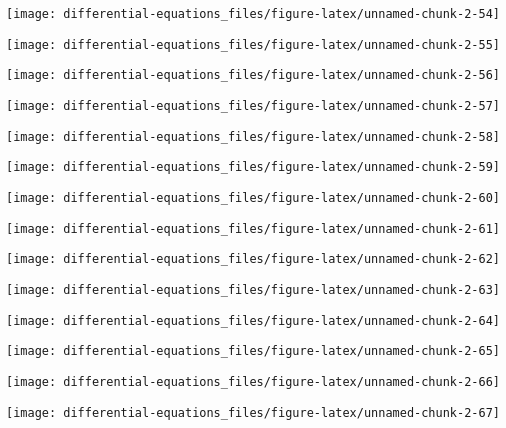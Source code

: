 \documentclass[]{tufte-handout}
\begin{document}
\begin{marginfigure}
\texttt{[image: differential-equations\_files/figure-latex/unnamed-chunk-2-54]} \end{marginfigure}
\begin{marginfigure}
\texttt{[image: differential-equations\_files/figure-latex/unnamed-chunk-2-55]} \end{marginfigure}
\begin{marginfigure}
\texttt{[image: differential-equations\_files/figure-latex/unnamed-chunk-2-56]} \end{marginfigure}
\begin{marginfigure}
\texttt{[image: differential-equations\_files/figure-latex/unnamed-chunk-2-57]} \end{marginfigure}
\begin{marginfigure}
\texttt{[image: differential-equations\_files/figure-latex/unnamed-chunk-2-58]} \end{marginfigure}
\begin{marginfigure}
\texttt{[image: differential-equations\_files/figure-latex/unnamed-chunk-2-59]} \end{marginfigure}
\begin{marginfigure}
\texttt{[image: differential-equations\_files/figure-latex/unnamed-chunk-2-60]} \end{marginfigure}
\begin{marginfigure}
\texttt{[image: differential-equations\_files/figure-latex/unnamed-chunk-2-61]} \end{marginfigure}
\begin{marginfigure}
\texttt{[image: differential-equations\_files/figure-latex/unnamed-chunk-2-62]} \end{marginfigure}
\begin{marginfigure}
\texttt{[image: differential-equations\_files/figure-latex/unnamed-chunk-2-63]} \end{marginfigure}
\begin{marginfigure}
\texttt{[image: differential-equations\_files/figure-latex/unnamed-chunk-2-64]} \end{marginfigure}
\begin{marginfigure}
\texttt{[image: differential-equations\_files/figure-latex/unnamed-chunk-2-65]} \end{marginfigure}
\begin{marginfigure}
\texttt{[image: differential-equations\_files/figure-latex/unnamed-chunk-2-66]} \end{marginfigure}
\begin{marginfigure}
\texttt{[image: differential-equations\_files/figure-latex/unnamed-chunk-2-67]} \end{marginfigure}
\end{document}
